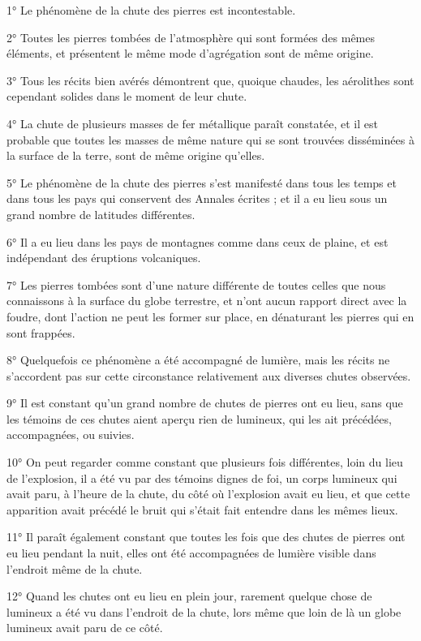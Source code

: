 \documentclass[a4paper, 12pt, oneside, french]{article}
\begin{document}
1° Le phénomène de la chute des pierres est incontestable.

2° Toutes les pierres tombées de l'atmosphère qui sont formées des mêmes éléments, et présentent le même mode d'agrégation sont de même origine.

3° Tous les récits bien avérés démontrent que, quoique chaudes, les aérolithes sont cependant solides dans le moment de leur chute.

4° La chute de plusieurs masses de fer métallique paraît constatée, et il est probable que toutes les masses de même nature qui se sont trouvées disséminées à la surface de la terre, sont de même origine qu'elles.

5° Le phénomène de la chute des pierres s'est manifesté dans tous les temps et dans tous les pays qui conservent des Annales écrites ; et il a eu lieu sous un grand nombre de latitudes différentes.

6° Il a eu lieu dans les pays de montagnes comme dans ceux de plaine, et est indépendant des éruptions volcaniques.

7° Les pierres tombées sont d'une nature différente de toutes celles que nous connaissons à la surface du globe terrestre, et n'ont aucun rapport direct avec la foudre, dont l'action ne peut les former sur place, en dénaturant les pierres qui en sont frappées.

8° Quelquefois ce phénomène a été accompagné de lumière, mais les récits ne s'accordent pas sur cette circonstance relativement aux diverses chutes observées.

9° Il est constant qu'un grand nombre de chutes de pierres ont eu lieu, sans que les témoins de ces chutes aient aperçu rien de lumineux, qui les ait précédées, accompagnées, ou suivies.

10° On peut regarder comme constant que plusieurs fois différentes, loin du lieu de l'explosion, il a été vu par des témoins dignes de foi, un corps lumineux qui avait paru, à l'heure de la chute, du côté où l'explosion avait eu lieu, et que cette apparition avait précédé le bruit qui s'était fait entendre dans les mêmes lieux.

11° Il paraît également constant que toutes les fois que des chutes de pierres ont eu lieu pendant la nuit, elles ont été accompagnées de lumière visible dans l'endroit même de la chute.

12° Quand les chutes ont eu lieu en plein jour, rarement quelque chose de lumineux a été vu dans l'endroit de la chute, lors même que loin de là un globe lumineux avait paru de ce côté.
\end{document}
